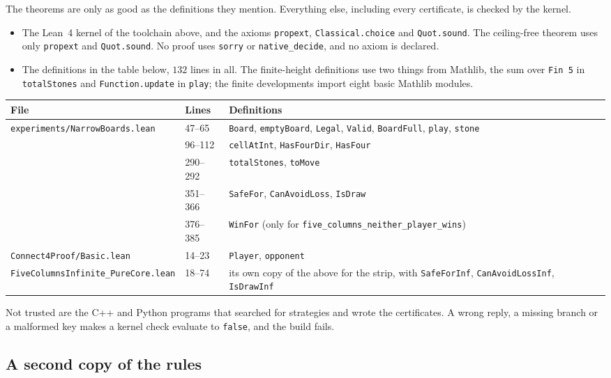 \documentclass[11pt,a4paper]{article}
\theoremstyle{plain}
\theoremstyle{definition}
\newcommand{\code}[1]{{\upshape\texttt{\small\nolinkurl{#1}}}}
\begin{document}
The theorems are only as good as the definitions they mention. Everything else, including every certificate, is checked by the kernel.
\begin{itemize}
  \item The Lean~4 kernel of the toolchain above, and the axioms \code{propext}, \code{Classical.choice} and \code{Quot.sound}. The ceiling-free theorem uses only \code{propext} and \code{Quot.sound}. No proof uses \code{sorry} or \code{native_decide}, and no axiom is declared.
  \item The definitions in the table below, $132$ lines in all. The finite-height definitions use two things from Mathlib, the sum over \code{Fin 5} in \code{totalStones} and \code{Function.update} in \code{play}; the finite developments import eight basic Mathlib modules.
\end{itemize}
\begin{center}
\small
\begin{tabularx}{\linewidth}{@{}l l Y@{}}
\toprule
\textbf{File} & \textbf{Lines} & \textbf{Definitions} \\
\midrule
\code{experiments/NarrowBoards.lean} & 47--65 & \code{Board}, \code{emptyBoard}, \code{Legal}, \code{Valid}, \code{BoardFull}, \code{play}, \code{stone} \\
 & 96--112 & \code{cellAtInt}, \code{HasFourDir}, \code{HasFour} \\
 & 290--292 & \code{totalStones}, \code{toMove} \\
 & 351--366 & \code{SafeFor}, \code{CanAvoidLoss}, \code{IsDraw} \\
 & 376--385 & \code{WinFor} (only for \code{five_columns_neither_player_wins}) \\
\code{Connect4Proof/Basic.lean} & 14--23 & \code{Player}, \code{opponent} \\
\code{FiveColumnsInfinite_PureCore.lean} & 18--74 & its own copy of the above for the strip, with \code{SafeForInf}, \code{CanAvoidLossInf}, \code{IsDrawInf} \\
\bottomrule
\end{tabularx}
\end{center}
Not trusted are the C++ and Python programs that searched for strategies and wrote the certificates. A wrong reply, a missing branch or a malformed key makes a kernel check evaluate to \code{false}, and the build fails.

\subsection{A second copy of the rules}
\label{sec:frozen}
\end{document}

